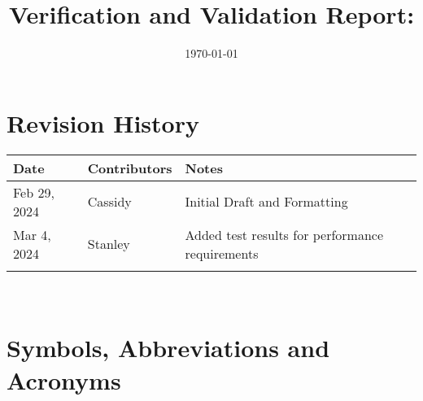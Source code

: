 \documentclass[12pt, titlepage]{article}
\begin{document}
\title{Verification and Validation Report: \progname} 
\author{\authname}
\date{\today}
	
\maketitle


\section{Revision History}

\begin{tabularx}{\textwidth}{p{3cm}p{2cm}X}
\toprule {\bf Date} & {\bf Contributors} & {\bf Notes}\\
\midrule
Feb 29, 2024 & Cassidy & Initial Draft and Formatting\\
Mar 4, 2024 & Stanley & Added test results for performance requirements\\
 &  & \\
\bottomrule
\end{tabularx}

~\newpage

\section{Symbols, Abbreviations and Acronyms}
\end{document}
